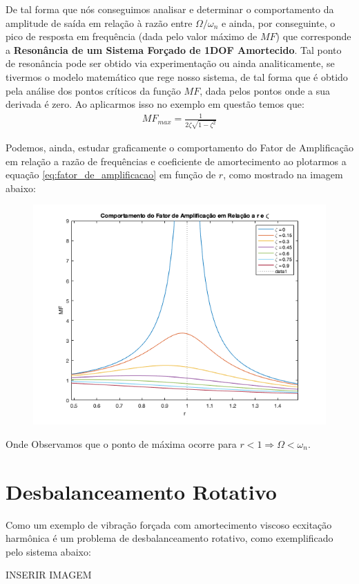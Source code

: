 \documentclass{article}
\begin{document}
            De tal forma que nós conseguimos analisar e determinar o comportamento da amplitude de saída em relação à razão entre $\Omega/\omega_n$ e ainda, por conseguinte, o pico de resposta em frequência (dada pelo valor máximo de $MF$) que corresponde a \textbf{Resonância de um Sistema Forçado de 1DOF
            Amortecido}. Tal ponto de resonância pode ser obtido via experimentação ou ainda analiticamente, se tivermos o modelo matemático que rege nosso sistema, de tal forma que é obtido pela análise
            dos pontos críticos da função $MF$, dada pelos pontos onde a sua derivada é zero. Ao aplicarmos isso no exemplo em questão temos que:
            \begin{align}
                MF_{max} = \frac{1}{2\zeta\sqrt{1-\zeta^2}}
            \end{align}

            Podemos, ainda, estudar graficamente o comportamento do Fator de Amplificação em relação a razão de frequências e coeficiente de amortecimento ao plotarmos a equação \ref{eq:fator_de_amplificacao} em função de $r$, como
            mostrado na imagem abaixo:

            \begin{figure}[h]
                \centering
                \includegraphics[width=.5\textwidth]{imgs/fator_ampl.png}
            \end{figure}

            Onde Observamos que o ponto de máxima ocorre para $r < 1 \Rightarrow \Omega < \omega_n$.

        \section{Desbalanceamento Rotativo}
            Como um exemplo de vibração forçada com amortecimento viscoso ecxitação harmônica  é um problema de desbalanceamento rotativo, como exemplificado pelo sistema abaixo:

            INSERIR IMAGEM 
\end{document}
